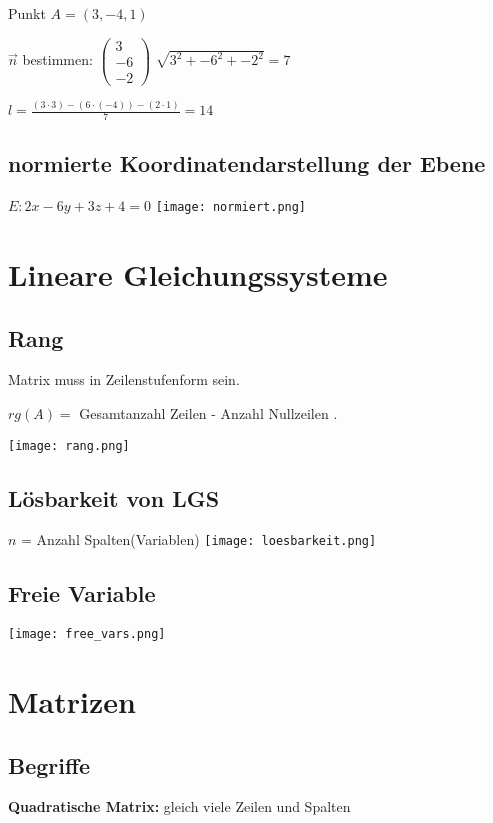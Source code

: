 \begin{multicols*}{3}
    {Punkt $A = (3,-4,1)$}


    { $\vec{n}$ bestimmen: $\begin{pmatrix}
                3  \\
                -6 \\
                -2
            \end{pmatrix}$ $\sqrt{3^2+-6^2+-2^2} = 7$}

    { $l = \frac{(3 \cdot 3) -(6 \cdot (-4)) - (2 \cdot 1)}{7} = 14$}
    \WhiteSpace


    \subsection{  normierte Koordinatendarstellung der Ebene}
    {$E: 2x - 6y +3z + 4 = 0$}
    \texttt{[image: normiert.png]}


    \section{Lineare Gleichungssysteme}
    \WhiteSpace
    \subsection{Rang}
    {Matrix muss in Zeilenstufenform sein.}

    {$rg(A) = $ Gesamtanzahl Zeilen - Anzahl Nullzeilen .}

    \texttt{[image: rang.png]}

    \subsection{Lösbarkeit von LGS}
    {$ n $ = Anzahl Spalten(Variablen)}
    \texttt{[image: loesbarkeit.png]}
    \subsection{Freie Variable}

    \texttt{[image: free\_vars.png]}

    \vfill\null
    \columnbreak
    \section{Matrizen}
    \subsection{Begriffe}
    {\textbf{Quadratische Matrix:} gleich viele Zeilen und Spalten}


\end{multicols*}
